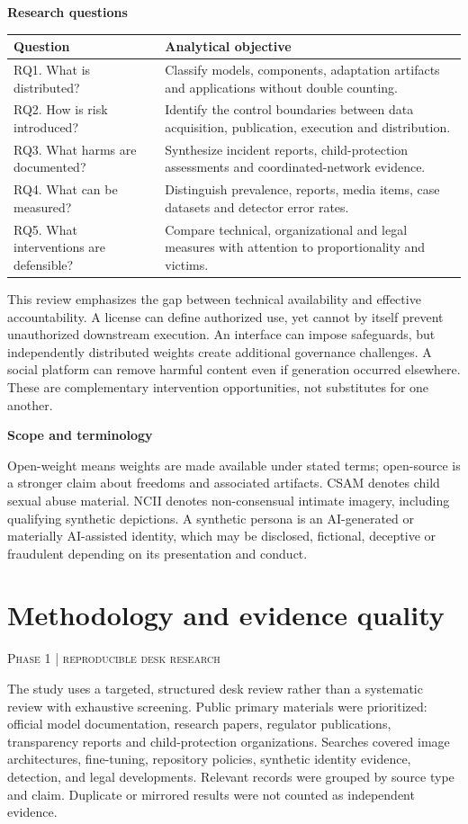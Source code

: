 \documentclass[10pt,a4paper]{article}
\newcommand{\sect}[2]{\Needspace{6\baselineskip}\section{#1}\textcolor{muted}{\small\textsc{#2}}\par\vspace{2mm}}
\newcommand{\sub}[1]{\vspace{1mm}\textbf{#1}\par}
\begin{document}
\sub{Research questions}

\begin{center}\small\begin{tabularx}{\linewidth}{@{}YY@{}}\toprule
\textbf{Question} & \textbf{Analytical objective}\\\midrule
RQ1. What is distributed? & Classify models, components, adaptation artifacts and applications without double counting.\\
RQ2. How is risk introduced? & Identify the control boundaries between data acquisition, publication, execution and distribution.\\
RQ3. What harms are documented? & Synthesize incident reports, child-protection assessments and coordinated-network evidence.\\
RQ4. What can be measured? & Distinguish prevalence, reports, media items, case datasets and detector error rates.\\
RQ5. What interventions are defensible? & Compare technical, organizational and legal measures with attention to proportionality and victims.\\\bottomrule\end{tabularx}\end{center}

This review emphasizes the gap between technical availability and effective accountability. A license can define authorized use, yet cannot by itself prevent unauthorized downstream execution. An interface can impose safeguards, but independently distributed weights create additional governance challenges. A social platform can remove harmful content even if generation occurred elsewhere. These are complementary intervention opportunities, not substitutes for one another.


\sub{Scope and terminology}

Open-weight means weights are made available under stated terms; open-source is a stronger claim about freedoms and associated artifacts. CSAM denotes child sexual abuse material. NCII denotes non-consensual intimate imagery, including qualifying synthetic depictions. A synthetic persona is an AI-generated or materially AI-assisted identity, which may be disclosed, fictional, deceptive or fraudulent depending on its presentation and conduct.


\sect{Methodology and evidence quality}{Phase 1 | reproducible desk research}

The study uses a targeted, structured desk review rather than a systematic review with exhaustive screening. Public primary materials were prioritized: official model documentation, research papers, regulator publications, transparency reports and child-protection organizations. Searches covered image architectures, fine-tuning, repository policies, synthetic identity evidence, detection, and legal developments. Relevant records were grouped by source type and claim. Duplicate or mirrored results were not counted as independent evidence.
\end{document}
